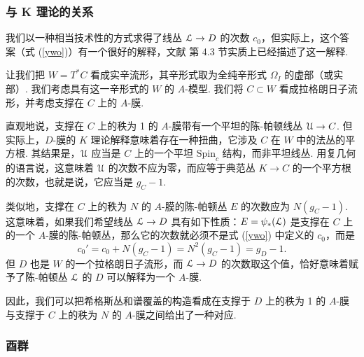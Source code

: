 \subsubsection{与 K 理论的关系}\label{dolfo}

我们以一种相当技术性的方式求得了线丛 ${\mathcal L}\to D$ 的次数 $c_0$，但实际上，这个答案（式 (\ref{ywo})）有一个很好的解释，文献 \cite{FW} 第 4.3 节实质上已经描述了这一解释.

让我们把 $W=T^*C$ 看成实辛流形，其辛形式取为全纯辛形式 $\Omega_I$ 的虚部（或实部）. 我们考虑具有这一辛形式的 $W$ 的 $A$-模型. 我们将 $C\subset W$ 看成拉格朗日子流形，并考虑支撑在 $C$ 上的 $A$-膜.

直观地说，支撑在 $C$ 上的秩为 1 的 $A$-膜带有一个平坦的陈-帕顿线丛 ${\mathcal U}\to C$. 但实际上，$D$-膜的 $K$ 理论解释意味着存在一种扭曲，它涉及 $C$ 在 $W$ 中的法丛的平方根. 其结果是，${\mathcal U}$ 应当是 $C$ 上的一个平坦 ${\mathrm{Spin}_c}$ 结构，而非平坦线丛. 用复几何的语言说，这意味着 ${\mathcal U}$ 的次数不应为零，而应等于典范丛 $K\to C$ 的一个平方根的次数，也就是说，它应当是 $g_C-1$.

类似地，支撑在 $C$ 上的秩为 $N$ 的 $A$-膜的陈-帕顿丛 $E$ 的次数应为 $N(g_C-1)$. 这意味着，如果我们希望线丛 ${\mathcal L}\to D$ 具有如下性质：$E=\psi_*({\mathcal L})$ 是支撑在 $C$ 上的一个 $A$-膜的陈-帕顿丛，那么它的次数就必须不是式 (\ref{ywo}) 中定义的 $c_0$，而是
\begin{equation}\label{tywo}c_0'=c_0+N(g_C-1)=N^2(g_C-1)=g_D-1. \end{equation}
但 $D$ 也是 $W$ 的一个拉格朗日子流形，而 ${\mathcal L}\to D$ 的次数取这个值，恰好意味着赋予了陈-帕顿丛 ${\mathcal L}$ 的 $D$ 可以解释为一个 $A$-膜.

因此，我们可以把希格斯丛和谱覆盖的构造看成在支撑于 $D$ 上的秩为 1 的 $A$-膜与支撑于 $C$ 上的秩为 $N$ 的 $A$-膜之间给出了一种对应.

\subsubsection{酉群}
\label{unitary}

